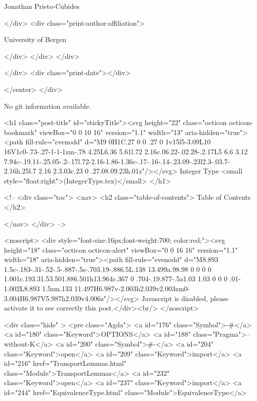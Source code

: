                   Jonathan Prieto-Cubides
                
              </div>
              <div class="print-author-affiliation">
                
                  University of Bergen
                
                </div>
            </div>
          </div>
          
          
        </div>
        <div class="print-date"></div>
        
        
    </center>
  </div>

  
  No git information available.
  

  <h1 class="post-title" id="stickyTitle"><svg height="22" class="octicon octicon-bookmark" viewBox="0 0 10 16" version="1.1" width="13" aria-hidden="true"><path fill-rule="evenodd" d="M9 0H1C.27 0 0 .27 0 1v15l5-3.09L10 16V1c0-.73-.27-1-1-1zm-.78 4.25L6.36 5.61l.72 2.16c.06.22-.02.28-.2.17L5 6.6 3.12 7.94c-.19.11-.25.05-.2-.17l.72-2.16-1.86-1.36c-.17-.16-.14-.23.09-.23l2.3-.03.7-2.16h.25l.7 2.16 2.3.03c.23 0 .27.08.09.23h.01z"/></svg> Integer Type <small style="float:right">(IntegerType.tex)</small>
  </h1>

  <!-- 
  <div class="toc">
    <nav>
    <h2 class="table-of-contents"> Table of Contents </h2>
      

    </nav>
  </div>
   -->

  <noscript>
  <div style="font-size:16px;font-weight:700; color:red;"><svg height="18" class="octicon octicon-alert" viewBox="0 0 16 16" version="1.1" width="18" aria-hidden="true"><path fill-rule="evenodd" d="M8.893 1.5c-.183-.31-.52-.5-.887-.5s-.703.19-.886.5L.138 13.499a.98.98 0 0 0 0 1.001c.193.31.53.501.886.501h13.964c.367 0 .704-.19.877-.5a1.03 1.03 0 0 0 .01-1.002L8.893 1.5zm.133 11.497H6.987v-2.003h2.039v2.003zm0-3.004H6.987V5.987h2.039v4.006z"/></svg> Javascript is disabled, please activate it to see correctly this post.</div><br/>
  </noscript>

  <div class="hide" >
<pre class="Agda">
<a id="176" class="Symbol">{-#</a> <a id="180" class="Keyword">OPTIONS</a> <a id="188" class="Pragma">--without-K</a> <a id="200" class="Symbol">#-}</a>
<a id="204" class="Keyword">open</a> <a id="209" class="Keyword">import</a> <a id="216" href="TransportLemmas.html" class="Module">TransportLemmas</a>
<a id="232" class="Keyword">open</a> <a id="237" class="Keyword">import</a> <a id="244" href="EquivalenceType.html" class="Module">EquivalenceType</a>

